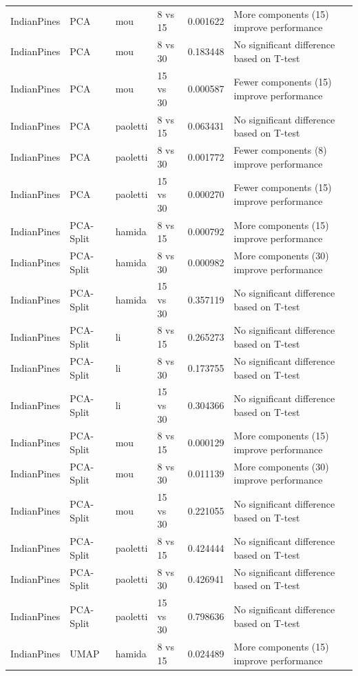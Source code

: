 \begin{longtable}{llllrl}
IndianPines & PCA & mou & 8 vs 15 & 0.001622 & More components (15) improve performance \\
IndianPines & PCA & mou & 8 vs 30 & 0.183448 & No significant difference based on T-test \\
IndianPines & PCA & mou & 15 vs 30 & 0.000587 & Fewer components (15) improve performance \\
IndianPines & PCA & paoletti & 8 vs 15 & 0.063431 & No significant difference based on T-test \\
IndianPines & PCA & paoletti & 8 vs 30 & 0.001772 & Fewer components (8) improve performance \\
IndianPines & PCA & paoletti & 15 vs 30 & 0.000270 & Fewer components (15) improve performance \\
IndianPines & PCA-Split & hamida & 8 vs 15 & 0.000792 & More components (15) improve performance \\
IndianPines & PCA-Split & hamida & 8 vs 30 & 0.000982 & More components (30) improve performance \\
IndianPines & PCA-Split & hamida & 15 vs 30 & 0.357119 & No significant difference based on T-test \\
IndianPines & PCA-Split & li & 8 vs 15 & 0.265273 & No significant difference based on T-test \\
IndianPines & PCA-Split & li & 8 vs 30 & 0.173755 & No significant difference based on T-test \\
IndianPines & PCA-Split & li & 15 vs 30 & 0.304366 & No significant difference based on T-test \\
IndianPines & PCA-Split & mou & 8 vs 15 & 0.000129 & More components (15) improve performance \\
IndianPines & PCA-Split & mou & 8 vs 30 & 0.011139 & More components (30) improve performance \\
IndianPines & PCA-Split & mou & 15 vs 30 & 0.221055 & No significant difference based on T-test \\
IndianPines & PCA-Split & paoletti & 8 vs 15 & 0.424444 & No significant difference based on T-test \\
IndianPines & PCA-Split & paoletti & 8 vs 30 & 0.426941 & No significant difference based on T-test \\
IndianPines & PCA-Split & paoletti & 15 vs 30 & 0.798636 & No significant difference based on T-test \\
IndianPines & UMAP & hamida & 8 vs 15 & 0.024489 & More components (15) improve performance \\

\end{longtable}
